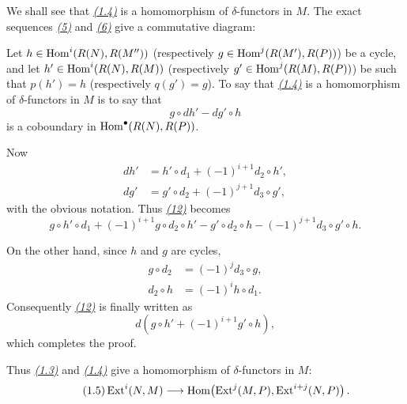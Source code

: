 We shall see that \emph{\hyperref[eq:V.1.4]{(1.4)}} is a homomorphism of $\delta$-functors in
$M$. The exact sequences \emph{\hyperref[eq:V.5]{(5)}} and \emph{\hyperref[eq:V.6]{(6)}} give a commutative
diagram:
\begin{center}
\end{center}
Let $h\in\operatorname{Hom}^i(R(N),R(M''))$ (respectively
$g\in\operatorname{Hom}^j(R(M'),R(P))$) be a cycle, and let
$h'\in\operatorname{Hom}^i(R(N),R(M))$ (respectively
$g'\in\operatorname{Hom}^j(R(M),R(P))$) be such that $p(h')=h$ (respectively
$q(g')=g$). To say that \emph{\hyperref[eq:V.1.4]{(1.4)}} is a homomorphism of $\delta$-functors
in $M$ is to say that
\begin{equation}\tag{12}\label{eq:V.12}
  g\circ dh'-dg'\circ h
\end{equation}
is a coboundary in $\operatorname{Hom}^{\bullet}(R(N),R(P))$.

Now
\begin{align*}
  dh'&=h'\circ d_1+(-1)^{i+1}d_2\circ h',\\
  dg'&=g'\circ d_2+(-1)^{j+1}d_3\circ g',
\end{align*}
with the obvious notation. Thus \emph{\hyperref[eq:V.12]{(12)}} becomes
\[
  g\circ h'\circ d_1+(-1)^{i+1}g\circ d_2\circ h'
  -g'\circ d_2\circ h-(-1)^{j+1}d_3\circ g'\circ h.
\]

On the other hand, since $h$ and $g$ are cycles,
\begin{align*}
  g\circ d_2&=(-1)^j d_3\circ g,\\
  d_2\circ h&=(-1)^i h\circ d_1.
\end{align*}
Consequently \emph{\hyperref[eq:V.12]{(12)}} is finally written as
\[
  d\!\left(g\circ h'+(-1)^{i+1}g'\circ h\right),
\]
which completes the proof.

Thus \emph{\hyperref[eq:V.1.3]{(1.3)}} and \emph{\hyperref[eq:V.1.4]{(1.4)}} give a homomorphism of $\delta$-functors
in $M$:
\begin{equation*}\tag{1.5}\label{eq:V.1.5}
  \operatorname{Ext}^i(N,M)\longrightarrow
  \operatorname{Hom}\!\left(\operatorname{Ext}^j(M,P),\operatorname{Ext}^{i+j}(N,P)\right).
\end{equation*}

